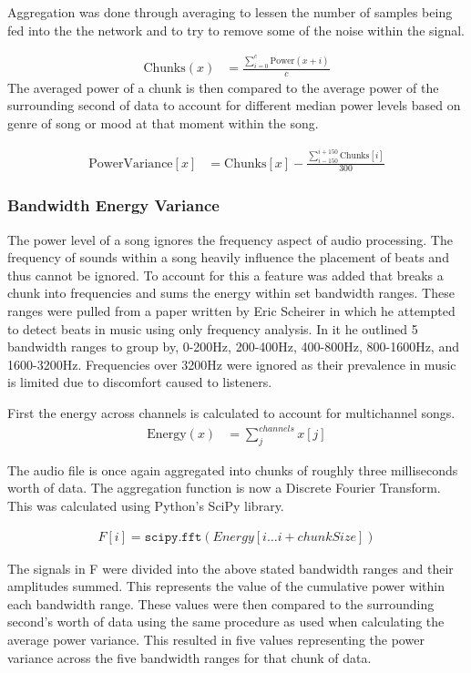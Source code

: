 Aggregation was done through averaging to lessen the number of samples being fed into the the network and to try to remove some of the noise within the signal.

\begin{align*}
	\text{Chunks}(x) &= \frac{\sum_{i=0}^{c}\text{Power}(x+i)}{c}
\end{align*}
The averaged power of a chunk is then compared to the average power of the surrounding second of data to account for different median power levels based on genre of song or mood at that moment within the song.

\begin{align*}
	\text{PowerVariance}[x] &= \text{Chunks}[x] - \frac{\sum_{i-150}^{i+150}\text{Chunks}[i]}{300}
\end{align*}

\subsubsection{Bandwidth Energy Variance}
The power level of a song ignores the frequency aspect of audio processing. The frequency of sounds within a song heavily influence the placement of beats and thus cannot be ignored. To account for this a feature was added that breaks a chunk into frequencies and sums the energy within set bandwidth ranges. These ranges were pulled from a paper written by Eric Scheirer in which he attempted to detect beats in music using only frequency analysis. In it he outlined 5 bandwidth ranges to group by, 0-200Hz, 200-400Hz, 400-800Hz, 800-1600Hz, and 1600-3200Hz\cite{bandwidthbreaks}. Frequencies over 3200Hz were ignored as their prevalence in music is limited due to discomfort caused to listeners.

First the energy across channels is calculated to account for multichannel songs.
\begin{align*}
 	\text{Energy}(x) &= \sum_j^{channels} x[j]
 \end{align*}

 The audio file is once again aggregated into chunks of roughly three milliseconds worth of data. The aggregation function is now a Discrete Fourier Transform. This was calculated using Python's SciPy library.

 \begin{align*}
 	F[i] =  \texttt{scipy.fft}(Energy[i \dots i+chunkSize])
 \end{align*}

The signals in F were divided into the above stated bandwidth ranges and their amplitudes summed. This represents the value of the cumulative power within each bandwidth range. These values were then compared to the surrounding second's worth of data using the same procedure as used when calculating the average power variance. This resulted in five values representing the power variance across the five bandwidth ranges for that chunk of data.

